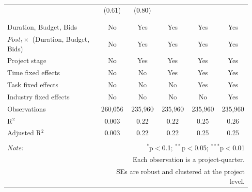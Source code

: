 \documentclass[
]{article}
\begin{document}
\begin{table}[H]
\begin{tabular}{@{\extracolsep{-2pt}}lccccc}
  & (0.61) & (0.80) &  &  &  \\ 
  & & & & & \\ 
\hline \\[-1.8ex] 
Duration, Budget, Bids & No & Yes & Yes & Yes & Yes \\ 
$Post_t \times $  (Duration, Budget, Bids) & No & Yes & Yes & Yes & Yes \\ 
Project stage & No & Yes & Yes & Yes & Yes \\ 
Time fixed effects & No & No & Yes & Yes & Yes \\ 
Task fixed effects & No & No & No & Yes & Yes \\ 
Industry fixed effects & No & No & No & No & Yes \\ 
Observations & 260,056 & 235,960 & 235,960 & 235,960 & 235,960 \\ 
R$^{2}$ & 0.003 & 0.22 & 0.22 & 0.25 & 0.26 \\ 
Adjusted R$^{2}$ & 0.003 & 0.22 & 0.22 & 0.25 & 0.25 \\ 
\hline 
\hline \\[-1.8ex] 
\textit{Note:}  & \multicolumn{5}{r}{$^{*}$p$<$0.1; $^{**}$p$<$0.05; $^{***}$p$<$0.01} \\ 
 & \multicolumn{5}{r}{Each observation is a project-quarter.} \\ 
 & \multicolumn{5}{r}{SEs are robust and clustered at the project level.} \\ 
\end{tabular} 
\end{table}
\end{document}
